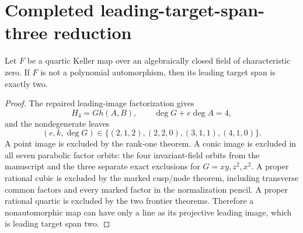 \section{Completed leading-target-span-three reduction}

\begin{corollary}
Let $F$ be a quartic Keller map over an algebraically closed field of
characteristic zero.  If $F$ is not a polynomial automorphism, then its
leading target span is exactly two.
\end{corollary}

\begin{proof}
The repaired leading-image factorization gives
\[
H_4=G h(A,B),\qquad \deg G+e\deg A=4,
\]
and the nondegenerate leaves
\[
(e,k,\deg G)\in\{(2,1,2),(2,2,0),(3,1,1),(4,1,0)\}.
\]
A point image is excluded by the rank-one theorem.  A conic image is
excluded in all seven parabolic factor orbits: the four invariant-field
orbits from the manuscript and the three separate exact exclusions for
$G=xy,z^2,x^2$.  A proper rational cubic is excluded by the marked
cusp/node theorem, including transverse common factors and every marked
factor in the normalization pencil.  A proper rational quartic is excluded
by the two frontier theorems.  Therefore a nonautomorphic map can have only
a line as its projective leading image, which is leading target span two.
\end{proof}

